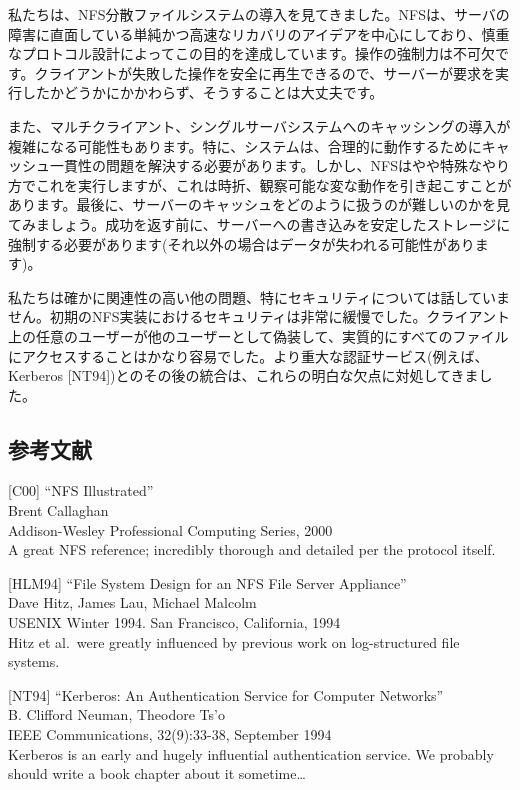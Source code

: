 私たちは、NFS分散ファイルシステムの導入を見てきました。NFSは、サーバの障害に直面している単純かつ高速なリカバリのアイデアを中心にしており、慎重なプロトコル設計によってこの目的を達成しています。操作の強制力は不可欠です。クライアントが失敗した操作を安全に再生できるので、サーバーが要求を実行したかどうかにかかわらず、そうすることは大丈夫です。

また、マルチクライアント、シングルサーバシステムへのキャッシングの導入が複雑になる可能性もあります。特に、システムは、合理的に動作するためにキャッシュ一貫性の問題を解決する必要があります。しかし、NFSはやや特殊なやり方でこれを実行しますが、これは時折、観察可能な変な動作を引き起こすことがあります。最後に、サーバーのキャッシュをどのように扱うのが難しいのかを見てみましょう。成功を返す前に、サーバーへの書き込みを安定したストレージに強制する必要があります(それ以外の場合はデータが失われる可能性があります)。

私たちは確かに関連性の高い他の問題、特にセキュリティについては話していません。初期のNFS実装におけるセキュリティは非常に緩慢でした。クライアント上の任意のユーザーが他のユーザーとして偽装して、実質的にすべてのファイルにアクセスすることはかなり容易でした。より重大な認証サービス(例えば、Kerberos
{[}NT94{]})とのその後の統合は、これらの明白な欠点に対処してきました。

\hypertarget{ux53c2ux8003ux6587ux732e-34}{%
\subsection*{参考文献}\label{ux53c2ux8003ux6587ux732e-34}}

{[}C00{]} ``NFS Illustrated''\\
Brent Callaghan\\
Addison-Wesley Professional Computing Series, 2000\\
A great NFS reference; incredibly thorough and detailed per the protocol
itself.

{[}HLM94{]} ``File System Design for an NFS File Server Appliance''\\
Dave Hitz, James Lau, Michael Malcolm\\
USENIX Winter 1994. San Francisco, California, 1994\\
Hitz et al.~were greatly influenced by previous work on log-structured
file systems.

{[}NT94{]} ``Kerberos: An Authentication Service for Computer
Networks''\\
B. Clifford Neuman, Theodore Ts'o\\
IEEE Communications, 32(9):33-38, September 1994\\
Kerberos is an early and hugely influential authentication service. We
probably should write a book chapter about it sometime\ldots{}

